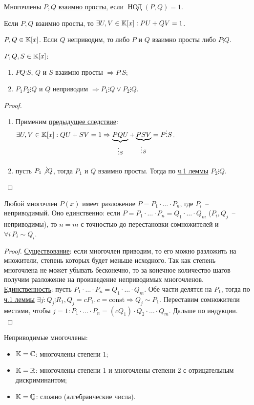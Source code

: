 \begin{defin}
	Многочлены $P,Q$ \underline{взаимно просты}, если $\operatorname{\text{НОД}}(P,Q)=1$.
\end{defin}
\label{coprime_corollary}\begin{cor}
	Если $P,Q$ взаимно просты, то $\exists U,V \in \mathbb{K}[x]: PU+QV=1$.
\end{cor}
\begin{rem}
	$P,Q \in \mathbb{K}[x]$. Если $Q$ неприводим, то либо $P$ и $Q$ взаимно просты либо $P \vdots Q$.
\end{rem}

\pagebreak
\begin{lemma}
	$P,Q,S \in \mathbb{K}[x]$:
	\begin{enumerate}
		\label{main_lemma_p1}\item $PQ \vdots S$, $Q$ и $S$ взаимно просты $\Rightarrow P \vdots S$;
		\item $P_1 P_2 \vdots Q$ и $Q$ неприводим $\Rightarrow P_1 \vdots Q \lor P_2 \vdots Q$.
	\end{enumerate}
\end{lemma}
\begin{proof}
	\begin{enumerate}
		\item Применим \hyperref[coprime_corollary]{предыдущее следствие}: $\exists U,V \in \mathbb{K}[x]: QU+SV=1 \Rightarrow \underbrace{PQU}_{\vdots S}+\underbrace{PSV}_{\vdots S}=P \vdots S$.
		\item пусть $P_1 \not\vdots Q$, тогда $P_1$ и $Q$ взаимно просты. Тогда по \hyperref[main_lemma_p1]{ч.1 леммы} $P_2 \vdots Q$.
	\end{enumerate}
\end{proof}

\begin{theo}
	Любой многочлен $P(x)$ имеет разложение $P=P_1 \cdot \ldots \cdot P_n$, где $P_i$~-- неприводимый. Оно единственно: если $P=P_1 \cdot \ldots \cdot P_n = Q_1 \cdot \ldots \cdot Q_m$ ($P_i, Q_j$~-- неприводимы), то $n=m$ с точностью до перестановки сомножителей и $\forall i\, P_i \sim Q_i$.
\end{theo}
\begin{proof}
	\underline{Существование}: если многочлен приводим, то его можно разложить на множители, степень которых будет меньше исходного. Так как степень многочлена не может убывать бесконечно, то за конечное количество шагов получим разложение на произведение неприводимых многочленов. \\
	\underline{Единственность}: пусть $P_1 \cdot \ldots \cdot P_n = Q_1 \cdot \ldots \cdot Q_m$. Обе части делятся на $P_1$, тогда по \hyperref[main_lemma_p1]{ч.1 леммы} $\exists j: Q_j \vdots R_1, Q_j=cP_1, c=\text{const} \Rightarrow Q_j \sim P_1$. Переставим сомножители местами, чтобы $j=1: P_1 \cdot \ldots \cdot P_n = (cQ_1) \cdot Q_2 \cdot \ldots \cdot Q_m$. Дальше по индукции.\\
\end{proof}

Неприводимые многочлены:
\begin{itemize}
	\item $\mathbb{K}=\mathbb{C}$: многочлены степени 1;
	\item $\mathbb{K}=\mathbb{R}$: многочлены степени 1 и многочлены степени 2 с отрицательным дискриминантом;
	\item $\mathbb{K}=\mathbb{Q}$: сложно (алгебраические числа).
\end{itemize}